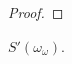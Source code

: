 \documentclass[11pt]{article}
\begin{document}
\begin{proof}

  \end{proof}

  \begin{theorem*}
    \(S'(\omega_\omega)\).
  \end{theorem*}
\end{document}
